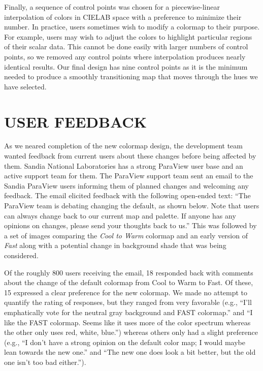 \documentclass{IEEEcsmag}
\newcommand*{\colormap}[1]{\textsl{#1}\xspace}
\newcommand*{\coolwarm}{\colormap{Cool to Warm}}
\newcommand*{\fast}{\colormap{Fast}}
\begin{document}
Finally, a sequence of control points was chosen for a piecewise-linear interpolation of colors in CIELAB space with a preference to minimize their number.
In practice, users sometimes wish to modify a colormap to their purpose.
For example, users may wish to adjust the colors to highlight particular regions of their scalar data.
This cannot be done easily with larger numbers of control points, so we removed any control points where interpolation produces nearly identical results.
Our final design has nine control points as it is the minimum needed to produce a smoothly transitioning map that moves through the hues we have selected.



\section{USER FEEDBACK}

As we neared completion of the new colormap design, the development team wanted feedback from current users about these changes before being affected by them.
Sandia National Laboratories has a strong ParaView user base and an active support team for them.
The ParaView support team sent an email to the Sandia ParaView users informing them of planned changes and welcoming any feedback.
The email elicited feedback with the following open-ended text: ``The ParaView team is debating changing the default, as shown below. Note that users can always change back to our current map and palette. If anyone has any opinions on changes, please send your thoughts back to us.''
This was followed by a set of images comparing the \coolwarm colormap and an early version of \fast along with a potential change in background shade that was being considered.

Of the roughly 800 users receiving the email, 18 responded back with comments about the change of the default colormap from Cool to Warm to Fast.
Of these, 15 expressed a clear preference for the new colormap.
We made no attempt to quantify the rating of responses, but they ranged from very favorable (e.g., ``I’ll emphatically vote for the neutral gray background and FAST colormap.'' and ``I like the FAST colormap. Seems like it uses more of the color spectrum whereas the other only uses red, white, blue.'') whereas others only had a slight preference (e.g., ``I don’t have a strong opinion on the default color map; I would maybe lean towards the new one.'' and ``The new one does look a bit better, but the old one isn’t too bad either.'').
\end{document}
